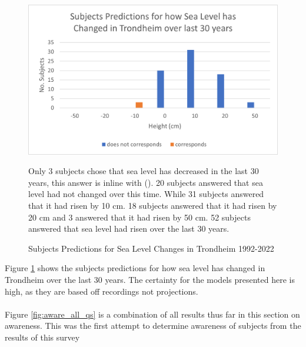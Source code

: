 \begin{figure}[H]
    \centering
    \includegraphics{fig_results/slr-past.png}
    \caption{Subjects Predictions for Sea Level Changes in Trondheim 1992-2022}{ Only 3 subjects chose that sea level has decreased in the last 30 years, this answer is inline with (\cite{kartverket_se_2021}). 20 subjects answered that sea level had not changed over this time. While 31 subjects answered that it had risen by 10 cm. 18 subjects answered that it had risen by 20 cm and 3 answered that it had risen by 50 cm. 52 subjects answered that sea level had risen over the last 30 years. }
    \label{fig:slr_past}
\end{figure}

Figure \ref{fig:slr_past} shows the subjects predictions for how sea level has changed in Trondheim over the last 30 years. The certainty for the models presented here is high, as they are based off recordings not projections. 
\paragraph{}

Figure \ref{fig:aware_all_qs} is a combination of all results thus far in this section on awareness. This was the first attempt to determine awareness of subjects from the results of this survey

